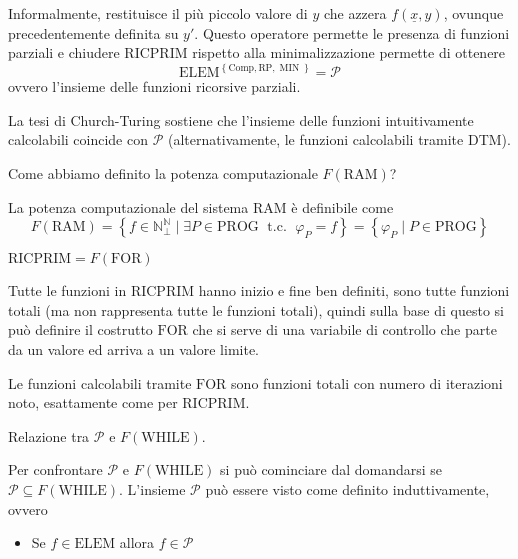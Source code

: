 \documentclass[12pt, answers]{exam}
\theoremstyle{plain}
\DeclareMathOperator{\MIN}{MIN}
\newcommand{\tc}{\; \text{ t.c. } \;}
\newcommand{\prog}{\text{PROG}}
\newcommand{\ram}{\text{RAM}}
\newcommand{\while}{\text{WHILE}}
\newcommand{\for}{\text{FOR}}
\newcommand{\elem}{\text{ELEM}}
\newcommand{\comp}{\text{Comp}}
\newcommand{\rp}{\text{RP}}
\newcommand{\ricprim}{\text{RICPRIM}}
\newcommand{\cp}{\mathcal{P}}
\newcommand{\N}{\mathbb{N}}
\begin{document}
\begin{questions}
\begin{solution}
            Informalmente, restituisce il più piccolo valore di $y$ che azzera $f(\underline x, y)$, ovunque precedentemente definita su $y'$. Questo operatore permette le presenza di funzioni parziali e chiudere $\ricprim$ rispetto alla minimalizzazione permette di ottenere
            $$ \elem^{\left\{\comp, \rp, \MIN\right\}} = \cp $$
            ovvero l'insieme delle funzioni ricorsive parziali.
        
            La tesi di Church-Turing sostiene che l'insieme delle funzioni intuitivamente calcolabili coincide con $\cp$ (alternativamente, le funzioni calcolabili tramite DTM).
        \end{solution}
        
        \question Come abbiamo definito la potenza computazionale $F(\ram)$?
        
        \begin{solution}
            La potenza computazionale del sistema $\ram$ è definibile come
            $$ F(\ram) = \left\{f \in \N_\bot^\N \mid \exists P \in \prog \tc \varphi_P = f \right\} = \left\{\varphi_P \mid P \in \prog \right\}$$
        \end{solution}
        
        \question $\ricprim = F(\for)$
        
        \begin{solution}
            Tutte le funzioni in $\ricprim$ hanno inizio e fine ben definiti, sono tutte funzioni totali (ma non rappresenta tutte le funzioni totali), quindi sulla base di questo si può definire il costrutto $\for$ che si serve di una variabile di controllo che parte da un valore ed arriva a un valore limite. 
            
            Le funzioni calcolabili tramite $\for$ sono funzioni totali con numero di iterazioni noto, esattamente come per $\ricprim$.
        \end{solution}
        
        \question Relazione tra $\cp$ e $F(\while)$.
        
        \begin{solution}
            Per confrontare $\cp$ e $F(\while)$ si può cominciare dal domandarsi se $\cp \subseteq F(\while)$. L'insieme $\cp$ può essere visto come definito induttivamente, ovvero
            \begin{itemize}
                \item Se $f \in \elem$ allora $f \in \cp$
                

\end{itemize}
\end{solution}
\end{questions}
\end{document}
